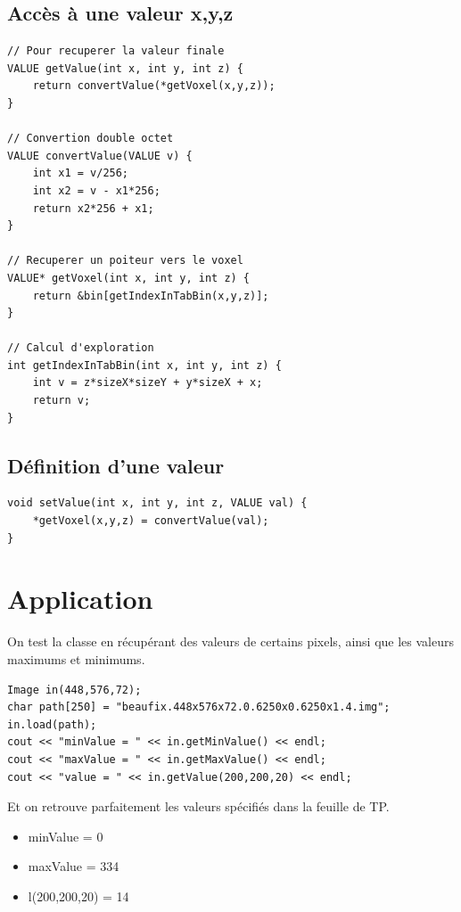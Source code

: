 \documentclass[a4paper,11pt]{article}
\begin{document}
\subsection{Accès à une valeur x,y,z}

\begin{lstlisting}
// Pour recuperer la valeur finale
VALUE getValue(int x, int y, int z) {
	return convertValue(*getVoxel(x,y,z));
}

// Convertion double octet
VALUE convertValue(VALUE v) {
	int x1 = v/256;
	int x2 = v - x1*256;
	return x2*256 + x1;
}

// Recuperer un poiteur vers le voxel
VALUE* getVoxel(int x, int y, int z) {
	return &bin[getIndexInTabBin(x,y,z)];
}

// Calcul d'exploration
int getIndexInTabBin(int x, int y, int z) {
	int v = z*sizeX*sizeY + y*sizeX + x;
	return v;
}
\end{lstlisting}

\subsection{Définition d'une valeur}

\begin{lstlisting}
void setValue(int x, int y, int z, VALUE val) {
	*getVoxel(x,y,z) = convertValue(val);
}
\end{lstlisting}

\section{Application}

On test la classe en récupérant des valeurs de certains pixels, ainsi que les valeurs maximums et minimums.

\begin{lstlisting}
Image in(448,576,72);
char path[250] = "beaufix.448x576x72.0.6250x0.6250x1.4.img";
in.load(path);
cout << "minValue = " << in.getMinValue() << endl;
cout << "maxValue = " << in.getMaxValue() << endl;
cout << "value = " << in.getValue(200,200,20) << endl;
\end{lstlisting}

Et on retrouve parfaitement les valeurs spécifiés dans la feuille de TP.

\begin{itemize}
  \item minValue = 0
  \item maxValue = 334
  \item l(200,200,20) = 14
\end{itemize}
\end{document}
